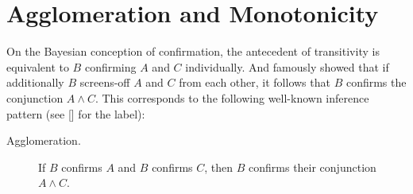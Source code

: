 \documentclass[a4paper,11pt]{article}
\begin{document}
\begin{table}[t]
\caption{Failure-prevalence for other inference patterns. Here, $>$ abbreviates Bayesian confirmation, a subscript indicates conditional confirmation. For an investigation of some of these patterns for absolute confirmation see \cite{Hawthorne1996} or \cite{Hawthorne2007}.}
\label{patterns}
\end{table}


\section{Agglomeration and Monotonicity}

On the Bayesian conception of confirmation, the antecedent of transitivity is equivalent to $B$ confirming $A$ and $C$ individually. And \cite{Reichenbach1956} famously showed that if additionally $B$ screens-off $A$ and $C$ from each other, it follows that $B$ confirms the conjunction $A\land C$. This corresponds to the following well-known inference pattern (see \citeauthor{Leitgeb2013lottery} [\citeyear{Leitgeb2013lottery}] for the label):

\begin{description}
\item[Agglomeration.] If $B$ confirms $A$ and $B$ confirms $C$, then $B$ confirms their conjunction $A\land C$.
\end{description}
\end{document}
